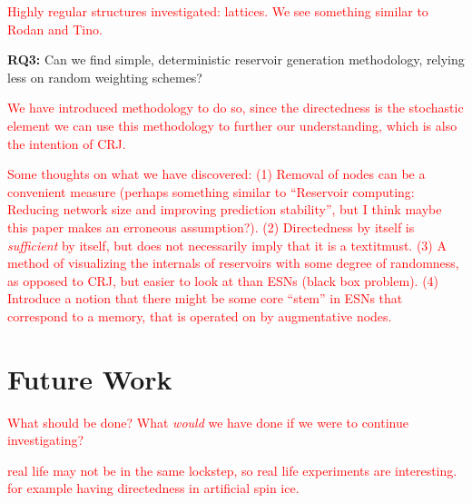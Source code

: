 \textcolor{red}{
  Highly regular structures investigated: lattices. We see something similar to
Rodan and Tino.
}

\textbf{RQ3:} Can we find simple, deterministic reservoir generation
methodology, relying less on random weighting schemes?

\textcolor{red}{
  We have introduced methodology to do so, since the directedness is the
stochastic element we can use this methodology to further our understanding,
which is also the intention of CRJ.
}

\textcolor{red}{
  Some thoughts on what we have discovered: (1) Removal of nodes can be a
convenient measure (perhaps something similar to ``Reservoir computing: Reducing
network size and improving prediction stability'', but I think maybe this paper
makes an erroneous assumption?). (2) Directedness by itself is
\textit{sufficient} by itself, but does not necessarily imply that it is a
textit{must}. (3) A method of visualizing the internals of reservoirs with some
degree of randomness, as opposed to CRJ, but easier to look at than ESNs (black
box problem). (4) Introduce a notion that there might be some core ``stem'' in
ESNs that correspond to a memory, that is operated on by augmentative nodes.
}

\section{Future Work}

\textcolor{red}{
  What should be done? What \textit{would} we have done if we were to continue
investigating?
}

\textcolor{red}{
  real life may not be in the same lockstep, so real life experiments are
  interesting. for example having directedness in artificial spin ice.
}

